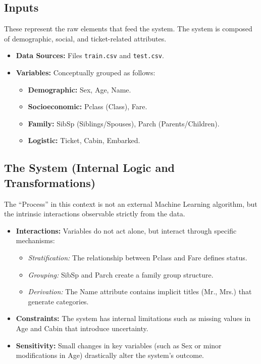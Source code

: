 \documentclass[12pt]{report}
\begin{document}
\subsection*{Inputs}
These represent the raw elements that feed the system. The system is composed of demographic, social, and ticket-related attributes.

\begin{itemize}
    \item \textbf{Data Sources:} Files \texttt{train.csv} and \texttt{test.csv}.
    \item \textbf{Variables:} Conceptually grouped as follows:
    \begin{itemize}
        \item \textbf{Demographic:} Sex, Age, Name.
        \item \textbf{Socioeconomic:} Pclass (Class), Fare.
        \item \textbf{Family:} SibSp (Siblings/Spouses), Parch (Parents/Children).
        \item \textbf{Logistic:} Ticket, Cabin, Embarked.
    \end{itemize}
\end{itemize}

\subsection*{The System (Internal Logic and Transformations)}
The ``Process'' in this context is not an external Machine Learning algorithm, but the intrinsic interactions observable strictly from the data.

\begin{itemize}
    \item \textbf{Interactions:} Variables do not act alone, but interact through specific mechanisms:
    \begin{itemize}
        \item \textit{Stratification:} The relationship between Pclass and Fare defines status.
        \item \textit{Grouping:} SibSp and Parch create a family group structure.
        \item \textit{Derivation:} The Name attribute contains implicit titles (Mr., Mrs.) that generate categories.
    \end{itemize}
    
    \item \textbf{Constraints:} The system has internal limitations such as missing values in Age and Cabin that introduce uncertainty.
    
    \item \textbf{Sensitivity:} Small changes in key variables (such as Sex or minor modifications in Age) drastically alter the system's outcome.
\end{itemize}
\end{document}
